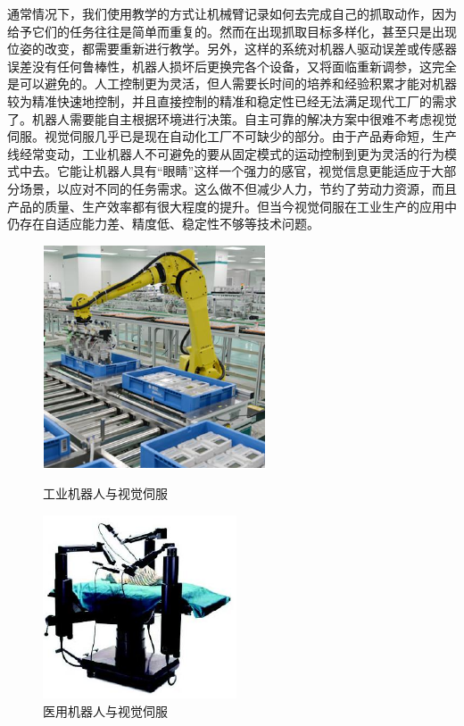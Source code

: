 \documentclass[fontset=fandol,type=bachelor,campus=harbin]{hithesisbook}
\begin{document}
通常情况下，我们使用教学的方式让机械臂记录如何去完成自己的抓取动作，因为给予它们的任务往往是简单而重复的。然而在出现抓取目标多样化，甚至只是出现位姿的改变，都需要重新进行教学\cite{tsuchida2021characteristics}。另外，这样的系统对机器人驱动误差或传感器误差没有任何鲁棒性，机器人损坏后更换完各个设备，又将面临重新调参，这完全是可以避免的。人工控制更为灵活，但人需要长时间的培养和经验积累才能对机器较为精准快速地控制，并且直接控制的精准和稳定性已经无法满足现代工厂的需求了。机器人需要能自主根据环境进行决策。自主可靠的解决方案中很难不考虑视觉伺服。视觉伺服几乎已是现在自动化工厂不可缺少的部分。由于产品寿命短，生产线经常变动，工业机器人不可避免的要从固定模式的运动控制到更为灵活的行为模式中去。它能让机器人具有“眼睛”这样一个强力的感官，视觉信息更能适应于大部分场景，以应对不同的任务需求。这么做不但减少人力，节约了劳动力资源，而且产品的质量、生产效率都有很大程度的提升\cite{zh1}。但当今视觉伺服在工业生产的应用中仍存在自适应能力差、精度低、稳定性不够等技术问题。
\begin{figure}[htbp]
\centering
\begin{minipage}[t]{0.48\textwidth}
\centering
\includegraphics[scale=1.0]{chapter1/工业机器人}
\caption{工业机器人与视觉伺服}
\end{minipage}
\begin{minipage}[t]{0.48\textwidth}
\centering
\includegraphics[scale=1.0]{chapter1/医用机器人}
\caption{医用机器人与视觉伺服}
\end{minipage}
\end{figure}
\end{document}

